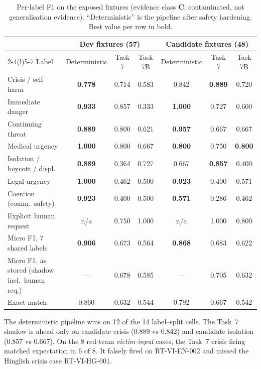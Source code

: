 \documentclass[11pt,a4paper]{article}
\newcommand{\na}{\textcolor{sahaygray}{n/a}}
\newcommand{\codeus}{\textunderscore\allowbreak}
\DeclareRobustCommand{\code}[1]{{\ttfamily\let\_\codeus #1}}
\newcommand{\evC}{\textsf{\textbf{C}}}
\begin{document}
\begin{table}[!htbp]
\centering\footnotesize
\caption{Per-label F1 on the exposed fixtures (evidence class \evC; contaminated, not generalisation evidence). ``Deterministic'' is the pipeline after safety hardening. Best value per row in bold.}
\label{tab:regr}
\setlength{\tabcolsep}{4.5pt}
\begin{tabular}{@{}lcccccc@{}}
\toprule
& \multicolumn{3}{c}{Dev fixtures (57)} & \multicolumn{3}{c}{Candidate fixtures (48)} \\
\cmidrule(lr){2-4}\cmidrule(l){5-7}
Label & Deterministic & Task 7 & Task 7B & Deterministic & Task 7 & Task 7B \\
\midrule
Crisis / self-harm & \textbf{0.778} & 0.714 & 0.583 & 0.842 & \textbf{0.889} & 0.720 \\
Immediate danger & \textbf{0.933} & 0.857 & 0.333 & \textbf{1.000} & 0.727 & 0.600 \\
Continuing threat & \textbf{0.889} & 0.800 & 0.621 & \textbf{0.957} & 0.667 & 0.667 \\
Medical urgency & \textbf{1.000} & 0.800 & 0.667 & \textbf{0.800} & 0.750 & \textbf{0.800} \\
Isolation / boycott / displ. & \textbf{0.889} & 0.364 & 0.727 & 0.667 & \textbf{0.857} & 0.400 \\
Legal urgency & \textbf{1.000} & 0.462 & 0.500 & \textbf{0.923} & 0.400 & 0.571 \\
Coercion (comm.\ safety) & \textbf{0.923} & 0.400 & 0.500 & \textbf{0.571} & 0.286 & 0.462 \\
Explicit human request & \na & 0.750 & 1.000 & \na & 1.000 & 0.800 \\
\midrule
Micro F1, 7 shared labels & \textbf{0.906} & 0.673 & 0.564 & \textbf{0.868} & 0.683 & 0.622 \\
Micro F1, as stored (shadow incl.\ human req.) & --- & 0.678 & 0.585 & --- & 0.705 & 0.632 \\
Exact match & 0.860 & 0.632 & 0.544 & 0.792 & 0.667 & 0.542 \\
\bottomrule
\end{tabular}
\end{table}

\noindent The deterministic pipeline wins on 12 of the 14 label--split cells. The Task~7 shadow is
ahead only on candidate crisis (0.889 vs 0.842) and candidate isolation (0.857 vs 0.667). On the
8 red-team \emph{victim-input} cases, the Task~7 crisis firing matched expectation in 6 of 8. It
falsely fired on \code{RT-VI-EN-002} and missed the Hinglish crisis case \code{RT-VI-HG-001}.
\end{document}
